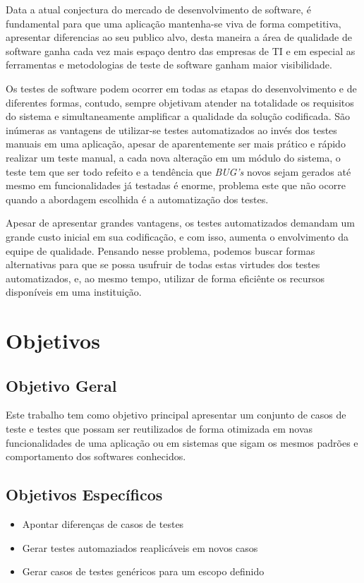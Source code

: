 \documentclass[12pt]{article}
\begin{document}
	Data a atual conjectura do mercado de desenvolvimento de software, é fundamental para
	que uma aplicação mantenha-se viva de forma competitiva, apresentar diferencias ao seu publico alvo, desta
	maneira a área de qualidade de software ganha cada vez mais espaço dentro das empresas de TI e em especial as ferramentas e
	metodologias de teste de software ganham maior visibilidade.
	
	Os testes de software podem ocorrer em todas as etapas do desenvolvimento e de diferentes formas, contudo,
	sempre objetivam atender na totalidade os requisitos do sistema e simultaneamente amplificar a qualidade da solução
	codificada. São inúmeras as vantagens de utilizar-se testes automatizados ao invés dos testes manuais em uma aplicação,
	apesar de aparentemente ser mais prático e rápido realizar um teste manual, a cada nova alteração em um módulo do sistema,
	o teste tem que ser todo refeito e a tendência que \emph{BUG's} novos sejam gerados até mesmo em funcionalidades já testadas é enorme,
	problema este que não ocorre quando a abordagem escolhida é a automatização dos testes.
	
	Apesar de apresentar grandes vantagens, os testes automatizados demandam um grande custo inicial em sua codificação,
	e com isso, aumenta o envolvimento da equipe de qualidade. Pensando nesse problema, podemos buscar formas alternativas para
	que se possa usufruir de todas estas virtudes dos testes automatizados, e, ao mesmo tempo, utilizar de forma eficiênte os
	recursos disponíveis em uma instituição.
	
	\section{Objetivos}
	
	\subsection{Objetivo Geral}
	
	Este trabalho tem como objetivo principal apresentar um conjunto de casos de teste e testes que possam ser reutilizados de
	forma otimizada em novas funcionalidades de uma aplicação ou em sistemas que sigam os mesmos padrões e comportamento dos
	softwares conhecidos.
	
	\subsection{Objetivos Específicos}
	\begin{itemize}
		\item Apontar diferenças de casos de testes
		\item Gerar testes automaziados reaplicáveis em novos casos
		\item Gerar casos de testes genéricos para um escopo definido
	\end{itemize}
	
\end{document}
